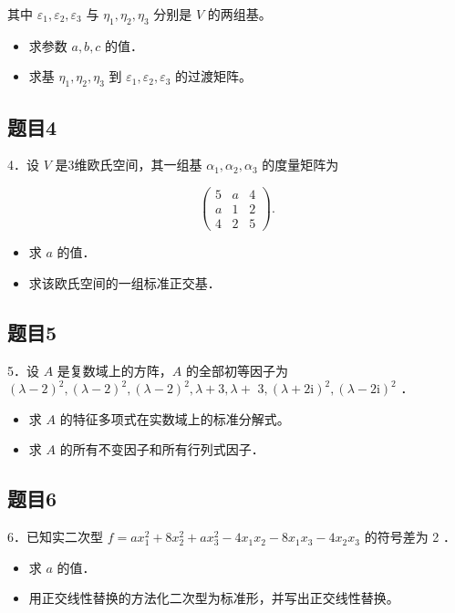 \documentclass{article}
\begin{document}
其中 \(\varepsilon_{1}, \varepsilon_{2}, \varepsilon_{3}\) 与 \(\eta_{1}, \eta_{2}, \eta_{3}\) 分别是 \(V\) 的两组基。

\begin{itemize}
  \item[（1）] 求参数 \(a, b, c\) 的值．
  \item[（2）] 求基 \(\eta_{1}, \eta_{2}, \eta_{3}\) 到 \(\varepsilon_{1}, \varepsilon_{2}, \varepsilon_{3}\) 的过渡矩阵。
\end{itemize}

\subsection{题目4}
4．设 \(V\) 是3维欧氏空间，其一组基 \(\alpha_{1}, \alpha_{2}, \alpha_{3}\) 的度量矩阵为

\[
\left(\begin{array}{lll}
5 & a & 4 \\
a & 1 & 2 \\
4 & 2 & 5
\end{array}\right) .
\]

\begin{itemize}
  \item[（1）] 求 \(a\) 的值．
  \item[（2）] 求该欧氏空间的一组标准正交基．
\end{itemize}

\subsection{题目5}
5．设 \(A\) 是复数域上的方阵，\(A\) 的全部初等因子为 \((\lambda-2)^{2},(\lambda-2)^{2},(\lambda-2)^{2}, \lambda+3, \lambda+\) \(3,(\lambda+2 \mathrm{i})^{2},(\lambda-2 \mathrm{i})^{2}\) ．

\begin{itemize}
  \item[（1）] 求 \(A\) 的特征多项式在实数域上的标准分解式。
  \item[（2）] 求 \(A\) 的所有不变因子和所有行列式因子．
\end{itemize}

\subsection{题目6}
6．已知实二次型 \(f=a x_{1}^{2}+8 x_{2}^{2}+a x_{3}^{2}-4 x_{1} x_{2}-8 x_{1} x_{3}-4 x_{2} x_{3}\) 的符号差为 2 ．

\begin{itemize}
  \item[（1）] 求 \(a\) 的值．
  \item[（2）] 用正交线性替换的方法化二次型为标准形，并写出正交线性替换。
\end{itemize}
\end{document}
